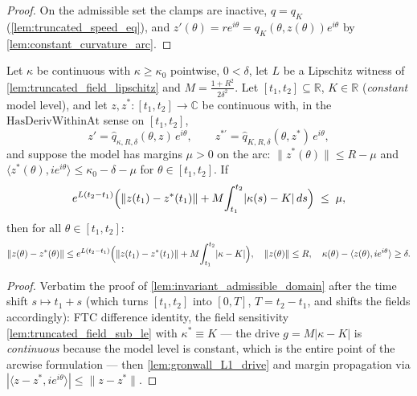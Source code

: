 \begin{proof}

\leanok
  On the admissible set the clamps are inactive, $\hat q=q_K$
  (\cref{lem:truncated_speed_eq}), and $z'(\theta)=re^{i\theta}
  =q_K(\theta,z(\theta))e^{i\theta}$ by \cref{lem:constant_curvature_arc}.
\end{proof}

\begin{lemma}
  \label{lem:invariant_admissible_arc}
  Let $\kappa$ be continuous with $\kappa\ge\kappa_0$ pointwise, $0<\delta$, let $L$ be a
  Lipschitz witness of \cref{lem:truncated_field_lipschitz} and
  $M=\tfrac{1+R^2}{2\delta^2}$. Let $[t_1,t_2]\subseteq\mathbb R$, $K\in\mathbb R$
  (\emph{constant} model level), and let $z,z^\ast:[t_1,t_2]\to\mathbb C$ be continuous
  with, in the $\mathrm{HasDerivWithinAt}$ sense on $[t_1,t_2]$,
  \[
    z'=\hat q_{\kappa,R,\delta}(\theta,z)\,e^{i\theta},\qquad
    z^{\ast\prime}=\hat q_{K,R,\delta}(\theta,z^\ast)\,e^{i\theta},
  \]
  and suppose the model has margins $\mu>0$ on the arc:
  $\|z^\ast(\theta)\|\le R-\mu$ and
  $\langle z^\ast(\theta),ie^{i\theta}\rangle\le\kappa_0-\delta-\mu$ for
  $\theta\in[t_1,t_2]$. If
  \[
    e^{L(t_2-t_1)}\Bigl(\|z(t_1)-z^\ast(t_1)\|
      +M\!\int_{t_1}^{t_2}\!|\kappa(s)-K|\,ds\Bigr)\;\le\;\mu,
  \]
  then for all $\theta\in[t_1,t_2]$:
  \[
    \|z(\theta)-z^\ast(\theta)\|\le
    e^{L(t_2-t_1)}\Bigl(\|z(t_1)-z^\ast(t_1)\|+M\!\int_{t_1}^{t_2}\!|\kappa-K|\Bigr),
    \quad
    \|z(\theta)\|\le R,\quad
    \kappa(\theta)-\langle z(\theta),ie^{i\theta}\rangle\ge\delta .
  \]
\end{lemma}

\begin{proof}

\leanok
  Verbatim the proof of \cref{lem:invariant_admissible_domain} after the time shift
  $s\mapsto t_1+s$ (which turns $[t_1,t_2]$ into $[0,T]$, $T=t_2-t_1$, and shifts the
  fields accordingly): FTC difference identity, the field sensitivity
  \cref{lem:truncated_field_sub_le} with $\kappa^\ast\equiv K$ — the drive
  $g=M|\kappa-K|$ is \emph{continuous} because the model level is constant, which is the
  entire point of the arcwise formulation — then \cref{lem:gronwall_L1_drive} and margin
  propagation via $|\langle z-z^\ast,ie^{i\theta}\rangle|\le\|z-z^\ast\|$.
\end{proof}

